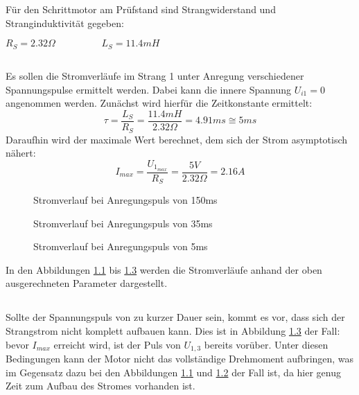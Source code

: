\chapter{}\label{ch:aufg2}
Für den Schrittmotor am Prüfstand sind Strangwiderstand und Stranginduktivität gegeben:
\begin{center}
	$ R_{S} = 2.32\Omega \hspace{2cm} L_{S} = 11.4mH $
\end{center}

\section{}\label{sec:2a}
Es sollen die Stromverläufe im Strang 1 unter Anregung verschiedener Spannungspulse ermittelt werden. Dabei kann die innere Spannung $ U_{i1} = 0$ angenommen werden. Zunächst wird hierfür die Zeitkonstante ermittelt:
\begin{equation}
	\tau = \frac{L_{S}}{R_{S}} = \frac{11.4mH}{2.32\Omega} = 4.91ms \cong 5ms
\end{equation}
Daraufhin wird der maximale Wert berechnet, dem sich der Strom asymptotisch nähert:
\begin{equation}
	I_{max} = \frac{U_{1_{max}}}{R_{S}} = \frac{5V}{2.32\Omega} = 2.16A
\end{equation}

\begin{figure}[h]
	\centering
	
	\label{fig:2:150}
	\caption{Stromverlauf bei Anregungspuls von 150ms}
\end{figure}
\begin{figure}[h]
	\centering
	
	\label{fig:2:35}
	\caption{Stromverlauf bei Anregungspuls von 35ms}
\end{figure}
\begin{figure}[h]
	\centering
	
	\label{fig:2:5}
	\caption{Stromverlauf bei Anregungspuls von 5ms}
\end{figure}
In den Abbildungen \ref{fig:2:150} bis \ref{fig:2:5} werden die Stromverläufe anhand der oben ausgerechneten Parameter dargestellt.

\section{}\label{sec:2b}
Sollte der Spannungspuls von zu kurzer Dauer sein, kommt es vor, dass sich der Strangstrom nicht komplett aufbauen kann. Dies ist in Abbildung \ref{fig:2:5} der Fall: bevor $ I_{max} $ erreicht wird, ist der Puls von $ U_{1,3} $ bereits vorüber. Unter diesen Bedingungen kann der Motor nicht das vollständige Drehmoment aufbringen, was im Gegensatz dazu bei den Abbildungen \ref{fig:2:150} und \ref{fig:2:35} der Fall ist, da hier genug Zeit zum Aufbau des Stromes vorhanden ist.
